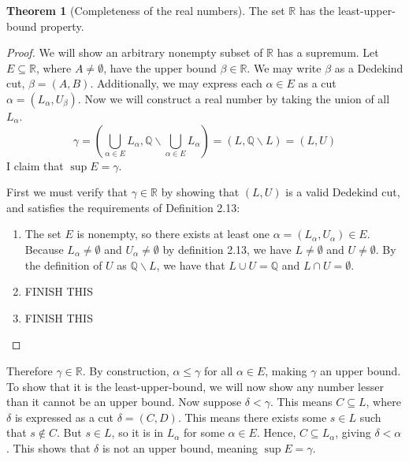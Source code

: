 \documentclass{article}
\newcommand{\R}{\mathbb{R}}
\newcommand{\Q}{\mathbb{Q}}
\theoremstyle{definition}
\newtheorem{theorem}{Theorem}[section]
\begin{document}
	\begin{theorem}[Completeness of the real numbers]
		The set $ \R $ has the least-upper-bound property.
		\begin{proof}
			We will show an arbitrary nonempty subset of $ \R $ has a supremum. Let $ E\subseteq \R $, where $ A\neq\emptyset $, have the upper bound $ \beta\in\R $. We may write $ \beta $ as a Dedekind cut, $ \beta=(A,B) $. Additionally, we may express each $ \alpha\in E $ as a cut $ \alpha=(L_\alpha,U_\beta) $. Now we will construct a real number by taking the union of all $ L_\alpha $.
			$$ \gamma=\left(\bigcup_{\alpha\in E}L_\alpha,\Q\backslash \bigcup_{\alpha\in E}L_\alpha\right)=(L,\Q\backslash
			L)=(L,U)$$  
			I claim that $ \sup E=\gamma $.
			
			First we must verify that $ \gamma\in\R $ by showing that $ (L,U) $ is a valid Dedekind cut, and satisfies the requirements of Definition 2.13: 
			\begin{enumerate}
				\item The set $ E $ is nonempty, so there exists at least one $ \alpha=(L_\alpha,U_\alpha)\in E $. Because $ L_\alpha\neq\emptyset $ and $ U_\alpha\neq\emptyset $ by definition 2.13, we have $ L\neq\emptyset $ and $ U\neq\emptyset $. By the definition of $ U $ as $ \Q\backslash L $, we have that $  L\cup U=\Q$ and $ L\cap U=\emptyset $. 
				\item {\color{red}FINISH THIS} 
				\item  {\color{red}FINISH THIS} 
			\end{enumerate}
		\end{proof}
		Therefore $ \gamma\in\R $. By construction, $ \alpha\le\gamma $ for all $ \alpha\in E $, making $ \gamma $ an upper bound. To show that it is the least-upper-bound, we will now show any number lesser than it cannot be an upper bound. Now suppose $ \delta <\gamma $. This means $  C\subseteq L $, where $ \delta $ is expressed as a cut $ \delta=(C,D) $. This means there exists some $ s\in L $ such that $ s\notin C $. But $ s\in L $, so it is in $ L_\alpha $ for some $ \alpha\in E $. Hence, $ C\subseteq L_\alpha $, giving $ \delta <\alpha $. This shows that $ \delta $ is not an upper bound, meaning $ \sup E =\gamma$.
	\end{theorem}
	
\end{document}
